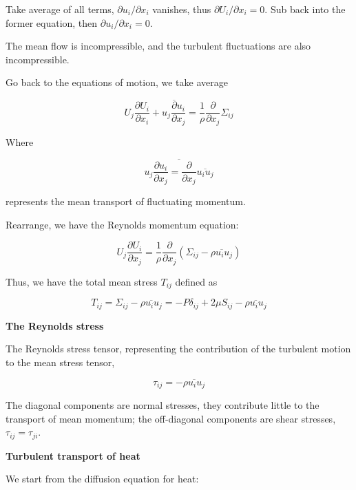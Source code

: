\documentclass{article}
\begin{document}
Take average of all terms, ${\partial u_i}/{\partial x_i}$ vanishes, thus $\partial U_i/\partial x_i=0$. Sub back into the former equation, then $\partial u_i/\partial x_i=0$.

The mean flow is incompressible, and the turbulent fluctuations are also incompressible.

Go back to the equations of motion, we take average

\begin{equation*}
    U_j\frac{\partial U_i}{\partial x_i}+\overline{u_j\frac{\partial u_i}{\partial x_j}}=\frac{1}{\rho}\frac{\partial}{\partial x_j}\Sigma_{ij}
\end{equation*}

Where

\begin{equation*}
    \overline{u_j\frac{\partial u_i}{\partial x_j}=\frac{\partial}{\partial x_j}\overline{u_iu_j}}
\end{equation*}

represents the mean transport of fluctuating momentum.

Rearrange, we have the Reynolds momentum equation:

\begin{equation*}
    U_j\frac{\partial U_i}{\partial x_j}=\frac{1}{\rho}\frac{\partial}{\partial x_j}\left(\Sigma_{ij}-\overline{\rho u_iu_j}\right)
\end{equation*}

Thus, we have the total mean stress $T_{ij}$ defined as

\begin{equation*}
    T_{ij}=\Sigma_{ij}-\overline{\rho u_iu_j}=-P\delta_{ij}+2\mu S_{ij}-\overline{\rho u_iu_j}
\end{equation*}

\textbf{The Reynolds stress}

The Reynolds stress tensor, representing the contribution of the turbulent motion to the mean stress tensor,

\begin{equation*}
    \tau_{ij}=-\overline{\rho u_iu_j}
\end{equation*}

The diagonal components are normal stresses, they contribute little to the transport of mean momentum; the off-diagonal components are shear stresses, $\tau_{ij}=\tau_{ji}$.

\textbf{Turbulent transport of heat}

We start from the diffusion equation for heat:
\end{document}
